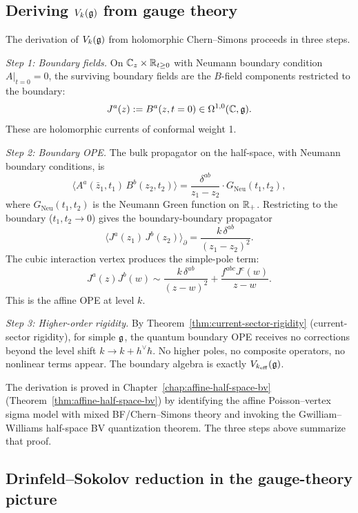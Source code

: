 \subsection{Deriving $V_k(\mathfrak{g})$ from gauge theory}

\begin{construction}
The derivation of $V_k(\mathfrak{g})$ from holomorphic Chern--Simons proceeds in
three steps.

\emph{Step 1: Boundary fields.} On $\mathbb{C}_z \times \mathbb{R}_{t \geq 0}$
with Neumann boundary condition $A|_{t=0} = 0$, the surviving boundary
fields are the $B$-field components restricted to the boundary:
\[
J^a(z) := B^a(z, t=0) \in \Omega^{1,0}(\mathbb{C}, \mathfrak{g}).
\]
These are holomorphic currents of conformal weight 1.

\emph{Step 2: Boundary OPE.} The bulk propagator on the half-space,
with Neumann boundary conditions, is
\[
\langle A^a(\bar{z}_1, t_1) \, B^b(z_2, t_2) \rangle
 = \frac{\delta^{ab}}{z_1 - z_2}
 \cdot G_{\mathrm{Neu}}(t_1, t_2),
\]
where $G_{\mathrm{Neu}}(t_1, t_2)$ is the Neumann Green function on
$\mathbb{R}_+$. Restricting to the boundary ($t_1, t_2 \to 0$) gives the
boundary-boundary propagator
\[
\langle J^a(z_1) \, J^b(z_2) \rangle_\partial
 = \frac{k \, \delta^{ab}}{(z_1 - z_2)^2}.
\]
The cubic interaction vertex produces the simple-pole term:
\[
J^a(z) J^b(w) \sim
 \frac{k \, \delta^{ab}}{(z-w)^2}
 + \frac{f^{abc} J^c(w)}{z - w}.
\]
This is the affine OPE at level $k$.

\emph{Step 3: Higher-order rigidity.} By
Theorem~\ref*{thm:current-sector-rigidity} (current-sector rigidity),
for simple $\mathfrak{g}$, the quantum boundary OPE receives no corrections
beyond the level shift $k \to k + h^\vee \hbar$. No higher poles, no
composite operators, no nonlinear terms appear. The boundary algebra is
exactly $V_{k_{\mathrm{eff}}}(\mathfrak{g})$.
\end{construction}

\begin{remark}
The derivation is proved in Chapter~\ref{chap:affine-half-space-bv}
(Theorem~\ref*{thm:affine-half-space-bv}) by identifying the affine
Poisson--vertex sigma model with mixed BF/Chern--Simons theory and
invoking the Gwilliam--Williams half-space BV quantization theorem.
The three steps above summarize that proof.
\end{remark}

\subsection{Drinfeld--Sokolov reduction in the gauge-theory picture}


